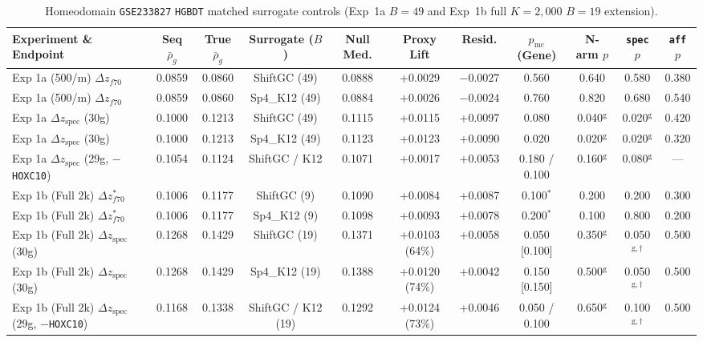 \documentclass[11pt,a4paper]{article}
\begin{document}
\begin{table}[htbp]
  \centering
  \caption{Homeodomain \texttt{GSE233827} \texttt{HGBDT} matched surrogate controls (Exp~1a $B=49$ and Exp~1b full $K=2{,}000$ $B=19$ extension).}
  \label{tab:hgbdt}
  \scriptsize
  \begin{tabular}{lcccccccccc}
    \toprule
    Experiment \& Endpoint & Seq $\bar{\rho}_g$ & True $\bar{\rho}_g$ & Surrogate ($B$) & Null Med. & Proxy Lift & Resid. & $p_{\mathrm{mc}}$ (Gene) & N-arm $p$ & \texttt{spec} $p$ & \texttt{aff} $p$ \\
    \midrule
    Exp 1a (500/m) $\Delta z_{f70}$ & 0.0859 & 0.0860 & ShiftGC (49) & 0.0888 & +0.0029 & $-0.0027$ & 0.560 & 0.640 & 0.580 & 0.380 \\
    Exp 1a (500/m) $\Delta z_{f70}$ & 0.0859 & 0.0860 & Sp4\_K12 (49) & 0.0884 & +0.0026 & $-0.0024$ & 0.760 & 0.820 & 0.680 & 0.540 \\
    Exp 1a $\Delta z_{\mathrm{spec}}$ (30g) & 0.1000 & 0.1213 & ShiftGC (49) & 0.1115 & +0.0115 & +0.0097 & 0.080 & 0.040$^{\mathrm{g}}$ & 0.020$^{\mathrm{g}}$ & 0.420 \\
    Exp 1a $\Delta z_{\mathrm{spec}}$ (30g) & 0.1000 & 0.1213 & Sp4\_K12 (49) & 0.1123 & +0.0123 & +0.0090 & 0.020 & 0.020$^{\mathrm{g}}$ & 0.020$^{\mathrm{g}}$ & 0.320 \\
    Exp 1a $\Delta z_{\mathrm{spec}}$ (29g, $-$\texttt{HOXC10}) & 0.1054 & 0.1124 & ShiftGC / K12 & 0.1071 & +0.0017 & +0.0053 & 0.180 / 0.100 & 0.160$^{\mathrm{g}}$ & 0.080$^{\mathrm{g}}$ & --- \\
    Exp 1b (Full 2k) $\Delta z_{f70}^*$ & 0.1006 & 0.1177 & ShiftGC (9) & 0.1090 & +0.0084 & +0.0087 & 0.100$^*$ & 0.200 & 0.200 & 0.300 \\
    Exp 1b (Full 2k) $\Delta z_{f70}^*$ & 0.1006 & 0.1177 & Sp4\_K12 (9) & 0.1098 & +0.0093 & +0.0078 & 0.200$^*$ & 0.100 & 0.800 & 0.200 \\
    Exp 1b (Full 2k) $\Delta z_{\mathrm{spec}}$ (30g) & 0.1268 & 0.1429 & ShiftGC (19) & 0.1371 & +0.0103 (64\%) & +0.0058 & 0.050 [0.100] & 0.350$^{\mathrm{g}}$ & 0.050$^{\mathrm{g},\dagger}$ & 0.500 \\
    Exp 1b (Full 2k) $\Delta z_{\mathrm{spec}}$ (30g) & 0.1268 & 0.1429 & Sp4\_K12 (19) & 0.1388 & +0.0120 (74\%) & +0.0042 & 0.150 [0.150] & 0.500$^{\mathrm{g}}$ & 0.050$^{\mathrm{g},\dagger}$ & 0.500 \\
    Exp 1b (Full 2k) $\Delta z_{\mathrm{spec}}$ (29g, $-$\texttt{HOXC10}) & 0.1168 & 0.1338 & ShiftGC / K12 (19) & 0.1292 & +0.0124 (73\%) & +0.0046 & 0.050 / 0.100 & 0.650$^{\mathrm{g}}$ & 0.100$^{\mathrm{g},\dagger}$ & 0.500 \\
    \bottomrule
  \end{tabular}
\end{table}
\end{document}

